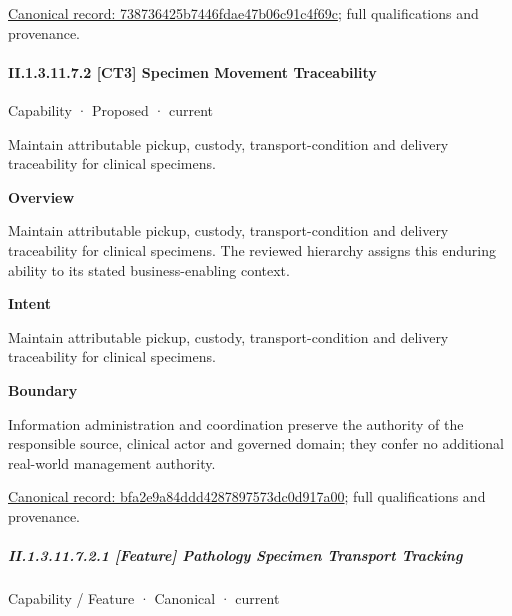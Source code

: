 {\footnotesize \href{../../../../continuum/strategy/capability/738736425b7446fdae47b06c91c4f69c.md}{Canonical record: 738736425b7446fdae47b06c91c4f69c}; full qualifications and provenance.}\par
\paragraph*{II.1.3.11.7.2 [CT3] Specimen Movement Traceability}
\label{navigation:II.1.3.11.7.2}

\label{element:bfa2e9a84ddd4287897573dc0d917a00}
{\small Capability · Proposed · current}\par

Maintain attributable pickup, custody, transport-condition and delivery traceability for clinical specimens.



\textbf{Overview}



Maintain attributable pickup, custody, transport-condition and delivery traceability for clinical specimens. The reviewed hierarchy assigns this enduring ability to its stated business-enabling context.



\textbf{Intent}



Maintain attributable pickup, custody, transport-condition and delivery traceability for clinical specimens.



\textbf{Boundary}



Information administration and coordination preserve the authority of the responsible source, clinical actor and governed domain; they confer no additional real-world management authority.


{\footnotesize \href{../../../../continuum/strategy/capability/bfa2e9a84ddd4287897573dc0d917a00.md}{Canonical record: bfa2e9a84ddd4287897573dc0d917a00}; full qualifications and provenance.}\par
\subparagraph*{II.1.3.11.7.2.1 [Feature] Pathology Specimen Transport Tracking}
\label{navigation:II.1.3.11.7.2.1}

\label{element:34f182cfc6b945d090a880943bbb4959}
{\small Capability / Feature · Canonical · current}\par

